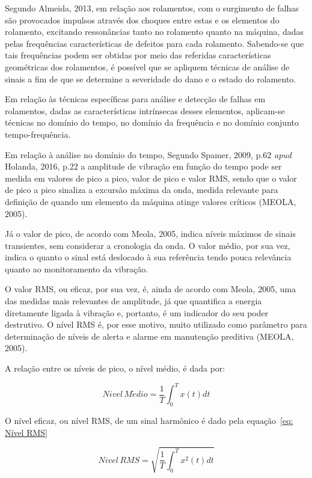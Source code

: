 \documentclass[
	12pt,				
	oneside,			
	a4paper,			
	english,			
	brazil,			
	]{abntex2ppgsi}
\begin{document}
Segundo Almeida, 2013, em relação aos rolamentos, com o surgimento de falhas são provocados impulsos através dos choques entre estas e os elementos do rolamento, excitando ressonâncias tanto no rolamento quanto na máquina, dadas pelas frequências características de defeitos para cada rolamento. Sabendo-se que tais frequências podem ser obtidas por meio das referidas características geométricas dos rolamentos, é possível que se apliquem técnicas de análise de sinais a fim de que se determine a severidade do dano e o estado do rolamento.

Em relação às técnicas específicas para análise e detecção de falhas em rolamentos, dadas as características intrínsecas desses elementos, aplicam-se técnicas no domínio do tempo, no domínio da frequência e no domínio conjunto tempo-frequência. 

Em relação à análise no domínio do tempo, Segundo Spamer, 2009, p.62 \textit{apud} Holanda, 2016, p.22 a amplitude de vibração em função do tempo pode ser medida em valores de pico a pico, valor de pico e valor RMS, sendo que o valor de pico a pico sinaliza a excursão máxima da onda, medida relevante para definição de quando um elemento da máquina atinge valores críticos (MEOLA, 2005). 

Já o valor de pico, de acordo com Meola, 2005, indica níveis máximos de sinais transientes, sem considerar a cronologia da onda. O valor médio, por sua vez, indica o quanto o sinal está deslocado à sua referência tendo pouca relevância quanto ao monitoramento da vibração. 

O valor RMS, ou eficaz, por sua vez, é, ainda de acordo com Meola, 2005, uma das medidas mais relevantes de amplitude, já que quantifica a energia diretamente ligada à vibração e, portanto, é um indicador do seu poder destrutivo. O nível RMS é, por esse motivo, muito utilizado como parâmetro para determinação de níveis de alerta e alarme em manutenção preditiva (MEOLA, 2005).

A relação entre os níveis de pico, o nível médio, é dada por:

\begin{equation}
	Nivel \, M\acute{e}dio = \frac{1}{T} \int_{0}^{T} x(t)dt
	\label{eq: Nível Médio}
\end{equation}

O nível eficaz, ou nível RMS, de um sinal harmônico é dado pela equação~\ref{eq: Nível RMS}

\begin{equation}
	Nivel \, RMS = \sqrt{ \frac{1}{T} \int_{0}^{T} x^{2}(t)dt }
	\label{eq: Nível RMS}
\end{equation}
\end{document}
